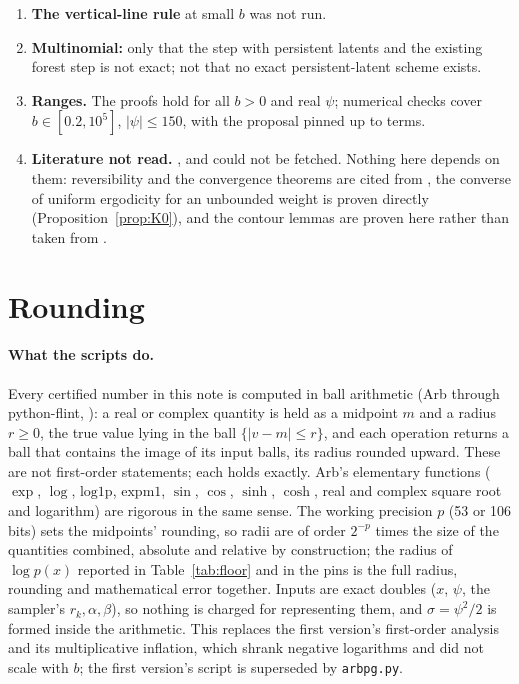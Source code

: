 \begin{enumerate}
rejection bound $2\TV(f,q)$.
\item \textbf{The vertical-line rule} at small $b$ was not run.
\item \textbf{Multinomial:} only that the step with persistent latents and the existing forest step is not exact;
not that no exact persistent-latent scheme exists.
\item \textbf{Ranges.} The proofs hold for all $b>0$ and real $\psi$; numerical checks cover $b\in[0.2,10^5]$,
$|\psi|\le150$, with the proposal pinned up to \QPINMAXK{} terms. \QPINKNOTE
\item \textbf{Literature not read.} \cite{tierney}, \cite{mt} and \cite{wt} could not be fetched. Nothing here
depends on them: reversibility and the convergence theorems are cited from \cite{rr}, the converse of uniform
ergodicity for an unbounded weight is proven directly (Proposition~\ref{prop:K0}), and the contour lemmas are
proven here rather than taken from \cite{wt}.
\end{enumerate}

\appendix

\section{Rounding}\label{app:round}

\paragraph{What the scripts do.} Every certified number in this note is computed in ball arithmetic (Arb through
python-flint, \cite{arb}): a real or complex quantity is held as a midpoint $m$ and a radius $r\ge0$, the true value
lying in the ball $\{|v-m|\le r\}$, and each operation returns a ball that contains the image of its input balls,
its radius rounded upward. These are not first-order statements; each holds exactly. Arb's elementary functions
($\exp$, $\log$, $\mathrm{log1p}$, $\mathrm{expm1}$, $\sin$, $\cos$, $\sinh$, $\cosh$, real and complex square root
and logarithm) are rigorous in the same sense. The working precision $p$ (53 or 106 bits) sets the midpoints'
rounding, so radii are of order $2^{-p}$ times the size of the quantities combined, absolute and relative by
construction; the radius of $\log p(x)$ reported in Table~\ref{tab:floor} and in the pins is the full radius,
rounding and mathematical error together. Inputs are exact doubles ($x$, $\psi$, the sampler's $r_k,\alpha,\beta$),
so nothing is charged for representing them, and $\sigma=\psi^2/2$ is formed inside the arithmetic. This replaces
the first version's first-order analysis and its multiplicative inflation, which shrank negative logarithms and
did not scale with $b$; the first version's script is superseded by \texttt{arbpg.py}.


